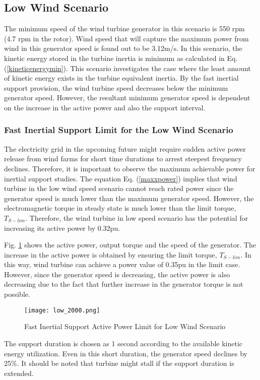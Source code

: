 \subsection{Low Wind Scenario}
\label{sec:lowwind}
The minimum speed of the wind turbine generator in this scenario is 550 rpm (4.7 rpm in the rotor). Wind speed that will capture the maximum power from wind in this generator speed is found out to be 3.12m/s. In this scenario, the kinetic energy stored in the turbine inertia is minimum as calculated in Eq. (\ref{kineticenergymin}). This scenario investigates the case where the least amount of kinetic energy exists in the turbine equivalent inertia. By the fast inertial support provision, the wind turbine speed decreases below the minimum generator speed. However, the resultant minimum generator speed is dependent on the increase in the active power and also the support interval.
\subsubsection{Fast Inertial Support Limit for the Low Wind Scenario}
The electricity grid in the upcoming future might require sudden active power release from wind farms for short time durations to arrest steepest frequency declines. Therefore, it is important to observe the maximum achievable power for inertial support studies. The equation Eq. (\ref{maxxpower}) implies that wind turbine in the low wind speed scenario cannot reach rated power since the generator speed is much lower than the maximum generator speed. However, the electromagnetic torque in steady state is much lower than the limit torque, $T_{S-lim}$. Therefore, the wind turbine in low speed scenario has the potential for increasing its active power by 0.32pu.\par
Fig. \ref{low_limit_power} shows the active power, output torque and the speed of the generator. The increase in the active power is obtained by ensuring the limit torque, $T_{S-lim}$. In this way, wind turbine can achieve a power value of 0.35pu in the limit case. However, since the generator speed is decreasing, the active power is also decreasing due to the fact that further increase in the generator torque is not possible. \par
\begin{figure}[h]
	\centering
	\texttt{[image: low\_2000.png]}
	\caption{Fast Inertial Support Active Power Limit for Low Wind Scenario}
	\label{low_limit_power}
\end{figure}
The support duration is chosen as 1 second according to the available kinetic energy utilization. Even in this short duration, the generator speed declines by 25\%. It should be noted that turbine might stall if the support duration is extended. \par
